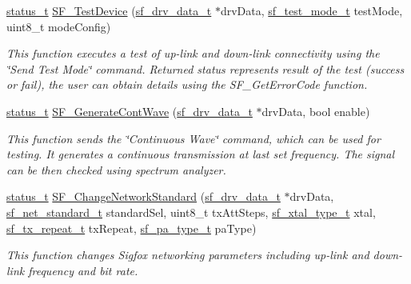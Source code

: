 \begin{DoxyCompactItemize}
\mbox{\hyperlink{group__ksdk__common_gaaabdaf7ee58ca7269bd4bf24efcde092}{status\+\_\+t}} \mbox{\hyperlink{group__sf__functions__group_gafd1dfd2b45bdd9aea388af2cb4466395}{S\+F\+\_\+\+Test\+Device}} (\mbox{\hyperlink{structsf__drv__data__t}{sf\+\_\+drv\+\_\+data\+\_\+t}} $\ast$drv\+Data, \mbox{\hyperlink{group__sf__enum__group_ga5c889c0804ec8ccd3741803bd8b12d9c}{sf\+\_\+test\+\_\+mode\+\_\+t}} test\+Mode, uint8\+\_\+t mode\+Config)
\begin{DoxyCompactList}\small\item\em This function executes a test of up-\/link and down-\/link connectivity using the \char`\"{}\+Send Test Mode\char`\"{} command. Returned status represents result of the test (success or fail), the user can obtain details using the S\+F\+\_\+\+Get\+Error\+Code function. \end{DoxyCompactList}\item 
\mbox{\hyperlink{group__ksdk__common_gaaabdaf7ee58ca7269bd4bf24efcde092}{status\+\_\+t}} \mbox{\hyperlink{group__sf__functions__group_gad68e87458650f476db5069272bd80f30}{S\+F\+\_\+\+Generate\+Cont\+Wave}} (\mbox{\hyperlink{structsf__drv__data__t}{sf\+\_\+drv\+\_\+data\+\_\+t}} $\ast$drv\+Data, bool enable)
\begin{DoxyCompactList}\small\item\em This function sends the \char`\"{}\+Continuous Wave\char`\"{} command, which can be used for testing. It generates a continuous transmission at last set frequency. The signal can be then checked using spectrum analyzer. \end{DoxyCompactList}\item 
\mbox{\hyperlink{group__ksdk__common_gaaabdaf7ee58ca7269bd4bf24efcde092}{status\+\_\+t}} \mbox{\hyperlink{group__sf__functions__group_ga3e532d1631eda3198b1e517be7db5288}{S\+F\+\_\+\+Change\+Network\+Standard}} (\mbox{\hyperlink{structsf__drv__data__t}{sf\+\_\+drv\+\_\+data\+\_\+t}} $\ast$drv\+Data, \mbox{\hyperlink{group__sf__enum__group_ga9ad07e4b666d7d70f7a69614ecb89421}{sf\+\_\+net\+\_\+standard\+\_\+t}} standard\+Sel, uint8\+\_\+t tx\+Att\+Steps, \mbox{\hyperlink{group__sf__enum__group_ga921cd8c6964917cde98f2a132c5548d5}{sf\+\_\+xtal\+\_\+type\+\_\+t}} xtal, \mbox{\hyperlink{group__sf__enum__group_ga7d2f06984784542a95d02e422a42d9cf}{sf\+\_\+tx\+\_\+repeat\+\_\+t}} tx\+Repeat, \mbox{\hyperlink{group__sf__enum__group_gac746e971077ef8c8dac9d26a8b47a2f9}{sf\+\_\+pa\+\_\+type\+\_\+t}} pa\+Type)
\begin{DoxyCompactList}\small\item\em This function changes Sigfox networking parameters including up-\/link and down-\/link frequency and bit rate. \end{DoxyCompactList}\item 

\end{DoxyCompactItemize}
